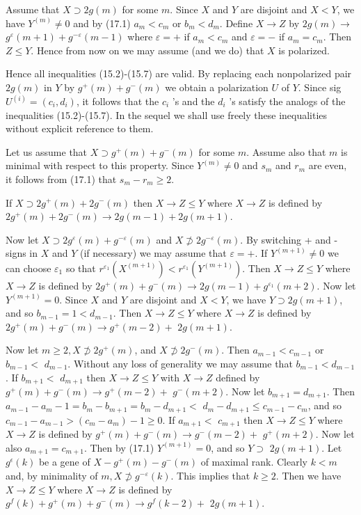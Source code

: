 \documentclass[10pt]{article}
\begin{document}
Assume that $X \supset 2 g(m)$ for some $m$. Since $X$ and $Y$ are disjoint and $X<Y$, we have $Y^{(m)} \neq 0$ and by (17.1) $a_{m}<c_{m}$ or $b_{m}<d_{m}$. Define $X \rightarrow Z$ by $2 g(m) \rightarrow$ $g^{\varepsilon}(m+1)+g^{-\varepsilon}(m-1)$ where $\varepsilon=+$ if $a_{m}<c_{m}$ and $\varepsilon=-$ if $a_{m}=c_{m}$. Then $Z \leqslant Y$. Hence from now on we may assume (and we do) that $X$ is polarized.

Hence all inequalities (15.2)-(15.7) are valid. By replacing each nonpolarized pair $2 g(m)$ in $Y$ by $g^{+}(m)+g^{-}(m)$ we obtain a polarization $U$ of $Y$. Since sig $U^{(i)}=\left(c_{i}, d_{i}\right)$, it follows that the $c_{i}$ 's and the $d_{i}$ 's satisfy the analogs of the inequalities (15.2)-(15.7). In the sequel we shall use freely these inequalities without explicit reference to them.

Let us assume that $X \supset g^{+}(m)+g^{-}(m)$ for some $m$. Assume also that $m$ is minimal with respect to this property. Since $Y^{(m)} \neq 0$ and $s_{m}$ and $r_{m}$ are even, it follows from (17.1) that $s_{m}-r_{m} \geqslant 2$.

If $X \supset 2 g^{+}(m)+2 g^{-}(m)$ then $X \rightarrow Z \leqslant Y$ where $X \rightarrow Z$ is defined by $2 g^{+}(m)+2 g^{-}(m) \rightarrow 2 g(m-1)+2 g(m+1)$.

Now let $X \supset 2 g^{\varepsilon}(m)+g^{-\varepsilon}(m)$ and $X \not \supset 2 g^{-\varepsilon}(m)$. By switching + and - signs in $X$ and $Y$ (if necessary) we may assume that $\varepsilon=+$. If $Y^{(m+1)} \neq 0$ we can choose $\varepsilon_{1}$ so that $r^{\varepsilon_{1}}\left(X^{(m+1)}\right)<r^{\varepsilon_{1}}\left(Y^{(m+1)}\right)$. Then $X \rightarrow Z \leqslant Y$ where $X \rightarrow Z$ is defined by $2 g^{+}(m)+g^{-}(m) \rightarrow 2 g(m-1)+g^{\varepsilon_{1}}(m+2)$. Now let $Y^{(m+1)}=0$. Since $X$ and $Y$ are disjoint and $X<Y$, we have $Y \supset 2 g(m+1)$, and so $b_{m-1}=1<d_{m-1}$. Then $X \rightarrow Z \leqslant Y$ where $X \rightarrow Z$ is defined by $2 g^{+}(m)+g^{-}(m) \rightarrow g^{+}(m-2)+$ $2 g(m+1)$.

Now let $m \geqslant 2, X \not \supset 2 g^{+}(m)$, and $X \not \supset 2 g^{-}(m)$. Then $a_{m-1}<c_{m-1}$ or $b_{m-1}<$ $d_{m-1}$. Without any loss of generality we may assume that $b_{m-1}<d_{m-1}$. If $b_{m+1}<$ $d_{m+1}$ then $X \rightarrow Z \leqslant Y$ with $X \rightarrow Z$ defined by $g^{+}(m)+g^{-}(m) \rightarrow g^{+}(m-2)+$ $g^{-}(m+2)$. Now let $b_{m+1}=d_{m+1}$. Then $a_{m-1}-a_{m}-1=b_{m}-b_{m+1}=b_{m}-d_{m+1}<$ $d_{m}-d_{m+1} \leqslant c_{m-1}-c_{m}$, and so $c_{m-1}-a_{m-1}>\left(c_{m}-a_{m}\right)-1 \geqslant 0$. If $a_{m+1}<$ $c_{m+1}$ then $X \rightarrow Z \leqslant Y$ where $X \rightarrow Z$ is defined by $g^{+}(m)+g^{-}(m) \rightarrow g^{-}(m-2)+$ $g^{+}(m+2)$. Now let also $a_{m+1}=c_{m+1}$. Then by (17.1) $Y^{(m+1)}=0$, and so $Y \supset$ $2 g(m+1)$. Let $g^{\epsilon}(k)$ be a gene of $X-g^{+}(m)-g^{-}(m)$ of maximal rank. Clearly $k<m$ and, by minimality of $m, X \not \supset g^{-\varepsilon}(k)$. This implies that $k \geqslant 2$. Then we have $X \rightarrow Z \leqslant Y$ where $X \rightarrow Z$ is defined by $g^{f}(k)+g^{+}(m)+g^{-}(m) \rightarrow g^{f}(k-2)+$ $2 g(m+1)$.
\end{document}
